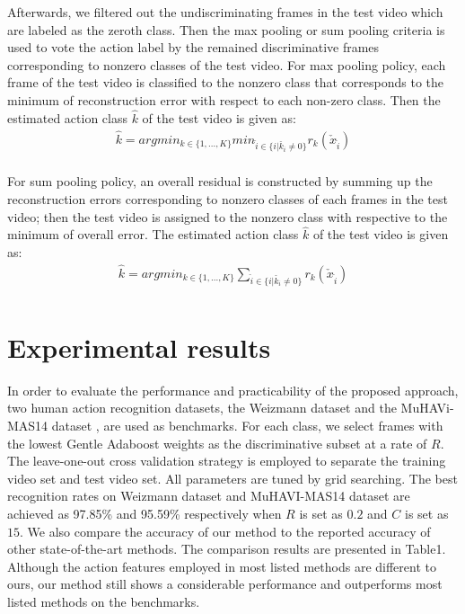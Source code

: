 \documentclass{article}
\begin{document}
 Afterwards, we  filtered out the undiscriminating frames in the test video which are labeled as the zeroth class.
Then the max pooling or sum pooling criteria is used  to vote the action label by the remained discriminative frames corresponding to nonzero classes of the test video.
For max pooling policy, each frame of the test video is classified to the nonzero class that corresponds to
the minimum of reconstruction error with respect to each non-zero class.
Then the estimated action class  $\hat{k}$ of the test video is given as:
 \begin{equation} \label{eq5}
 \begin{aligned}
\hat{k}=argmin_{k\in \{1,...,K\}}min_{\hat{i} \in \{i| \check{k_i} \neq 0  \}} r_{k}(\check{x}_{\hat{i}})    \\
\end{aligned}
\end{equation}

For sum pooling policy, an overall residual is constructed by summing up the reconstruction errors corresponding to nonzero classes of each frames in  the test video;
then the test video is assigned to the nonzero class with respective to the minimum of overall error.
The estimated action class  $\hat{k}$ of the test video is given as:
 \begin{equation} \label{eq5}
 \begin{aligned}
\hat{k}=argmin_{k\in \{1,...,K\}}\sum_{\hat{i} \in \{i| \check{k_i} \neq 0  \}} r_{k}(\check{x}_{\hat{i}})   \\
\end{aligned}
\end{equation}





\section{Experimental results}

In order to evaluate the performance and practicability of the proposed approach,
two human action recognition datasets, the Weizmann dataset \cite{ActionsAsSpaceTimeShapes_pami07} and the MuHAVi-MAS14 dataset \cite{Singh}, are used
as benchmarks.
For each class, we select frames with the lowest Gentle Adaboost weights as the discriminative subset at a rate of $R$.
The leave-one-out cross validation strategy is employed to separate the training video set and test video set.
All parameters are tuned by grid searching.
The best recognition rates on Weizmann dataset and MuHAVI-MAS14 dataset are achieved as 97.85\% and 95.59\% respectively when  $R$ is set as $0.2$ and  $C$ is set as $15$.
We also compare the accuracy of our method to the reported accuracy of  other state-of-the-art methods.
The comparison results are presented in Table1.
Although the action features employed in most listed methods are different to ours, our method still shows a considerable performance and outperforms most listed methods on the benchmarks.
\end{document}
